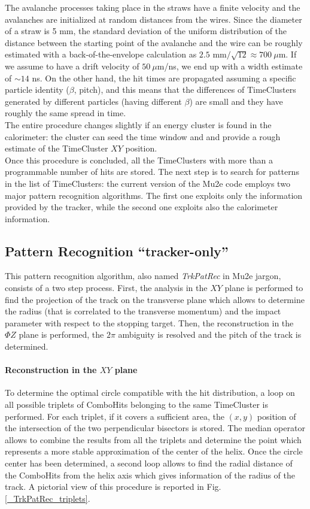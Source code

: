 \documentclass[12pt,a4paper,openright, oneside, titlepage]{book} %
\begin{document}
\noindent The avalanche processes taking place in the straws have a finite velocity and the avalanches are initialized at random distances from the wires. 
Since the diameter of a straw is 5 mm, the standard deviation of the uniform distribution of the distance between the starting point of the avalanche and the wire can be roughly estimated with a back-of-the-envelope calculation as $2.5$ mm$/\sqrt{12}\approx 700\ \mu$m. 
If we assume to have a drift velocity of $50\ \mu$m/ns, we end up with a width estimate of $\sim 14$ ns. 
On the other hand, the hit times are propagated assuming a specific particle identity ($\beta$, pitch), and this means that the differences of TimeClusters generated by different particles (having different $\beta$) are small and they have roughly the same spread in time.\\
The entire procedure changes slightly if an energy cluster is found in the calorimeter: the cluster can seed the time window and and provide a rough estimate of the TimeCluster $XY$ position.\\

\noindent Once this procedure is concluded, all the TimeClusters with more than a programmable number of hits are stored. 
The next step is to search for patterns in the list of TimeClusters:  the current version of the Mu2e code employs two major pattern recognition algorithms. 
The first one exploits only the information provided by the tracker, while the second one exploits also the calorimeter information.

\subsection{Pattern Recognition ``tracker-only''}
This pattern recognition algorithm, also named \textit{TrkPatRec} in Mu2e jargon, consists of a two step process. 
First, the analysis in the $XY$ plane is performed to find the projection of the track on the transverse plane which allows to determine the radius (that is correlated to the transverse momentum) and the impact parameter with respect to the stopping target. 
Then, the reconstruction in the $\Phi Z$ plane is performed, the $2\pi$ ambiguity is resolved and the pitch of the track is determined.

\paragraph{Reconstruction in the $XY$ plane} To determine the optimal circle compatible with the hit distribution, 
a loop on all possible triplets of ComboHits belonging to the same TimeCluster is performed. 
For each triplet, if it covers a sufficient area, the $(x,y)$ position of the intersection 
of the two perpendicular bisectors is stored. 
The median operator allows to combine the results from all the triplets and determine 
the point which represents a more stable approximation of the center of the helix. 
Once the circle center has been determined, 
a second loop allows to find the radial distance of the ComboHits from the helix axis 
which gives information of the radius of the track. 
A pictorial view of this procedure is reported in Fig. \ref{_TrkPatRec_triplets}.
\end{document}

